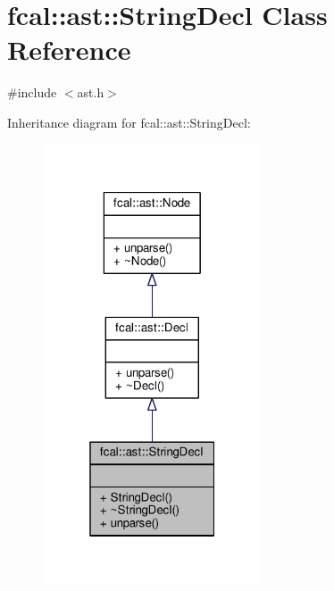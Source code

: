 \hypertarget{classfcal_1_1ast_1_1StringDecl}{}\section{fcal\+:\+:ast\+:\+:String\+Decl Class Reference}
\label{classfcal_1_1ast_1_1StringDecl}


{\ttfamily \#include $<$ast.\+h$>$}



Inheritance diagram for fcal\+:\+:ast\+:\+:String\+Decl\+:
\nopagebreak
\begin{figure}[H]
\begin{center}
\leavevmode
\includegraphics[width=184pt]{classfcal_1_1ast_1_1StringDecl__inherit__graph}
\end{center}
\end{figure}


